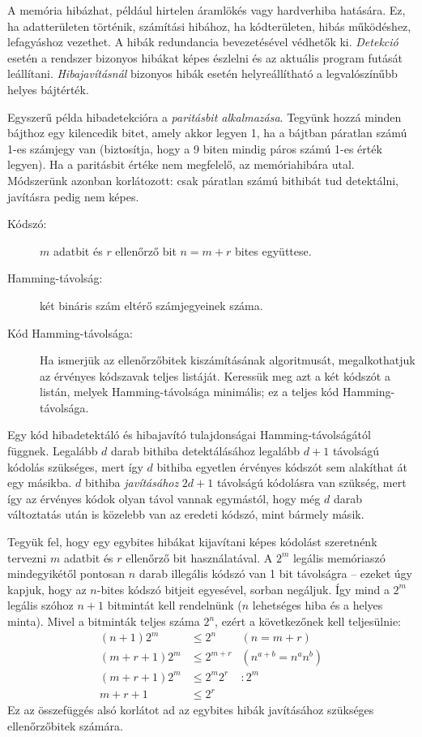 \documentclass[a4paper]{article}
\begin{document}
A memória hibázhat, például hirtelen áramlökés vagy hardverhiba hatására. Ez, ha adatterületen történik, számítási hibához, ha kódterületen, hibás működéshez, lefagyáshoz vezethet. A hibák redundancia bevezetésével védhetők ki. \emph{Detekció} esetén a rendszer bizonyos hibákat képes észlelni és az aktuális program futását leállítani. \emph{Hibajavításnál} bizonyos hibák esetén helyreállítható a legvalószínűbb helyes bájtérték.

Egyszerű példa hibadetekcióra a \emph{paritásbit alkalmazása}. Tegyünk hozzá minden bájthoz egy kilencedik bitet, amely akkor legyen 1, ha a bájtban páratlan számú 1-es számjegy van (biztosítja, hogy a 9 biten mindig páros számú 1-es érték legyen). Ha a paritásbit értéke nem megfelelő, az memóriahibára utal. Módszerünk azonban korlátozott: csak páratlan számú bithibát tud detektálni, javításra pedig nem képes.

\begin{description}
	\item[Kódszó:] $m$ adatbit és $r$ ellenőrző bit $n=m+r$ bites együttese.
	\item[Hamming-távolság:] két bináris szám eltérő számjegyeinek száma.
	\item[Kód Hamming-távolsága:] Ha ismerjük az ellenőrzőbitek kiszámításának algoritmusát, megalkothatjuk az érvényes kódszavak teljes listáját. Keressük meg azt a két kódszót a listán, melyek Hamming-távolsága minimális; ez a teljes kód Hamming-távolsága.
\end{description}

Egy kód hibadetektáló és hibajavító tulajdonságai Hamming-távolságától függnek. Legalább $d$ darab bithiba detektálásához legalább $d+1$ távolságú kódolás szükséges, mert így $d$ bithiba egyetlen érvényes kódszót sem alakíthat át egy másikba. $d$ bithiba \emph{javításához} $2d+1$ távolságú kódolásra van szükség, mert így az érvényes kódok olyan távol vannak egymástól, hogy még $d$ darab változtatás után is közelebb van az eredeti kódszó, mint bármely másik.

Tegyük fel, hogy egy egybites hibákat kijavítani képes kódolást szeretnénk tervezni $m$ adatbit és $r$ ellenőrző bit használatával. A $2^m$ legális memóriaszó mindegyikétől pontosan $n$ darab illegális kódszó van 1 bit távolságra -- ezeket úgy kapjuk, hogy az $n$-bites kódszó bitjeit egyesével, sorban negáljuk. Így mind a $2^m$ legális szóhoz $n+1$ bitmintát kell rendelnünk ($n$ lehetséges hiba és a helyes minta). Mivel a bitminták teljes száma $2^n$, ezért a következőnek kell teljesülnie:
\begin{align*}
	(n + 1)2^m     & \leq 2^n     & (n = m + r)         \\
	(m + r + 1)2^m & \leq 2^{m+r} & (n^{a+b} = n^a n^b) \\
	(m + r + 1)2^m & \leq 2^m 2^r & : 2^m               \\
	m + r + 1      & \leq 2^r
\end{align*}
Ez az összefüggés alsó korlátot ad az egybites hibák javításához szükséges ellenőrzőbitek számára.
\end{document}
